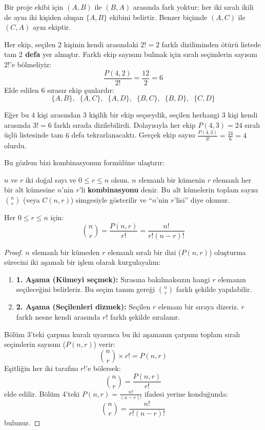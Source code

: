 Bir proje ekibi için $(A, B)$ ile $(B, A)$ arasında fark yoktur; her iki sıralı ikili de aynı iki kişiden oluşan $\{A, B\}$ ekibini belirtir. Benzer biçimde $(A, C)$ ile $(C, A)$ aynı ekiptir. 

Her ekip, seçilen $2$ kişinin kendi arasındaki $2! = 2$ farklı diziliminden ötürü listede tam \textbf{$2$ defa} yer almıştır. Farklı ekip sayısını bulmak için sıralı seçimlerin sayısını $2!$'e bölmeliyiz:
\[ \frac{P(4, 2)}{2!} = \frac{12}{2} = 6 \]
Elde edilen $6$ sırasız ekip şunlardır:
\[ \{A, B\}, \;\; \{A, C\}, \;\; \{A, D\}, \;\; \{B, C\}, \;\; \{B, D\}, \;\; \{C, D\} \]

Eğer bu $4$ kişi arasından $3$ kişilik bir ekip seçseydik, seçilen herhangi $3$ kişi kendi arasında $3! = 6$ farklı sırada dizilebilirdi. Dolayısıyla her ekip $P(4, 3) = 24$ sıralı üçlü listesinde tam $6$ defa tekrarlanacaktı. Gerçek ekip sayısı $\frac{P(4, 3)}{3!} = \frac{24}{6} = 4$ olurdu.

Bu gözlem bizi kombinasyonun formülüne ulaştırır:

\begin{definition}
$n$ ve $r$ iki doğal sayı ve $0 \le r \le n$ olsun. $n$ elemanlı bir kümenin $r$ elemanlı her bir alt kümesine $n$'nin $r$'li \textbf{kombinasyonu} denir. Bu alt kümelerin toplam sayısı $\binom{n}{r}$ (veya $C(n, r)$) simgesiyle gösterilir ve ``$n$'nin $r$'lisi'' diye okunur.
\end{definition}

\begin{theorem}
Her $0 \le r \le n$ için:
\[ \binom{n}{r} = \frac{P(n, r)}{r!} = \frac{n!}{r!(n - r)!} \]
\end{theorem}
\begin{proof}
$n$ elemanlı bir kümeden $r$ elemanlı sıralı bir dizi ($P(n, r)$) oluşturma sürecini iki aşamalı bir işlem olarak kurgulayalım:
\begin{enumerate}
  \item \textbf{1. Aşama (Kümeyi seçmek):} Sırasına bakılmaksızın hangi $r$ elemanın seçileceğini belirleriz. Bu seçim tanım gereği $\binom{n}{r}$ farklı şekilde yapılabilir.
  \item \textbf{2. Aşama (Seçilenleri dizmek):} Seçilen $r$ elemanı bir sıraya dizeriz. $r$ farklı nesne kendi arasında $r!$ farklı şekilde sıralanır.
\end{enumerate}
Bölüm 3'teki çarpma kuralı uyarınca bu iki aşamanın çarpımı toplam sıralı seçimlerin sayısını ($P(n, r)$) verir:
\[ \binom{n}{r} \times r! = P(n, r) \]
Eşitliğin her iki tarafını $r!$'e bölersek:
\[ \binom{n}{r} = \frac{P(n, r)}{r!} \]
elde edilir. Bölüm 4'teki $P(n, r) = \frac{n!}{(n-r)!}$ ifadesi yerine konduğunda:
\[ \binom{n}{r} = \frac{n!}{r!(n - r)!} \]
bulunur.
\end{proof}

